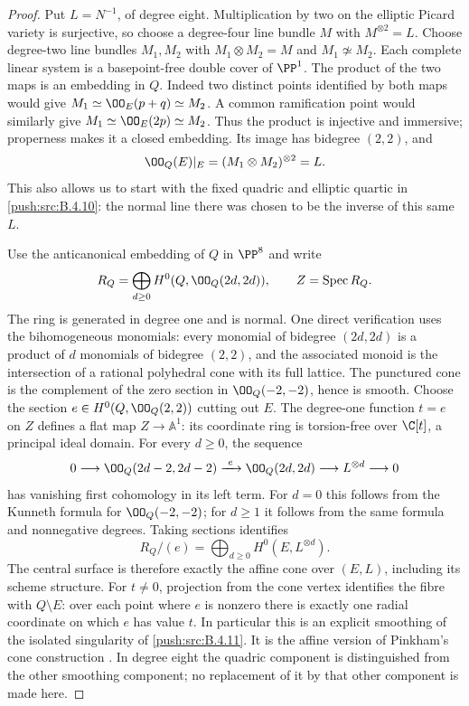 \begin{proof}
Put $L=N^{-1}$, of degree eight.  Multiplication by two on the
elliptic Picard variety is surjective, so choose a degree-four
line bundle $M$ with $M^{\otimes2}=L$.
Choose degree-two line bundles $M_1,M_2$ with
$M_1\otimes M_2=M$ and $M_1\not\simeq M_2$.
Each complete linear system is a basepoint-free double cover of
$\PP^1$.  The product of the two maps is an embedding in $Q$.
Indeed two distinct points identified by both maps would give
$M_1\simeq\OO_E(p+q)\simeq M_2$.
A common ramification point would similarly give
$M_1\simeq\OO_E(2p)\simeq M_2$.
Thus the product is injective and immersive; properness makes it a
closed embedding.  Its image has bidegree $(2,2)$, and
\[
 \OO_Q(E)|_E=(M_1\otimes M_2)^{\otimes2}=L.
\]
This also allows us to start with the fixed quadric and elliptic
quartic in \ref{push:src:B.4.10}: the normal line there was chosen to be the
inverse of this same $L$.

Use the anticanonical embedding of $Q$ in $\PP^8$ and write
\[
 R_Q=\bigoplus_{d\ge0}H^0(Q,\OO_Q(2d,2d)),\qquad
 Z=\operatorname{Spec}R_Q.
\]
The ring is generated in degree one and is normal.
One direct verification uses the bihomogeneous monomials:
every monomial of bidegree $(2d,2d)$ is a product of $d$
monomials of bidegree $(2,2)$, and the associated monoid is the
intersection of a rational polyhedral cone with its full lattice.
The punctured cone is the complement of the zero section in
$\OO_Q(-2,-2)$, hence is smooth.
Choose the section $e\in H^0(Q,\OO_Q(2,2))$ cutting out $E$.
The degree-one function $t=e$ on $Z$ defines a flat map
$Z\to\mathbb A^1$: its coordinate ring is torsion-free over
$\C[t]$, a principal ideal domain.
For every $d\ge0$, the sequence
\[
 0\longrightarrow\OO_Q(2d-2,2d-2)
 \xrightarrow{\ e\ }\OO_Q(2d,2d)
 \longrightarrow L^{\otimes d}\longrightarrow0
\]
has vanishing first cohomology in its left term.
For $d=0$ this follows from the Kunneth formula for
$\OO_Q(-2,-2)$; for $d\ge1$ it follows from the same formula
and nonnegative degrees.
Taking sections identifies
\[
 R_Q/(e)=\bigoplus_{d\ge0}H^0(E,L^{\otimes d}).
\]
The central surface is therefore exactly the affine cone over
$(E,L)$, including its scheme structure.
For $t\ne0$, projection from the cone vertex identifies the
fibre with $Q\setminus E$: over each point where $e$ is nonzero
there is exactly one radial coordinate on which $e$ has value $t$.
In particular this is an explicit smoothing of the isolated
singularity of \ref{push:src:B.4.11}.
It is the affine version of Pinkham's cone construction
\citep[Remark~7.6(iii), p.~46; Section~9, pp.~63--65]{Pinkham1974Root}.
In degree eight the quadric component is distinguished from the
other smoothing component; no replacement of it by that other
component is made here.


\end{proof}
